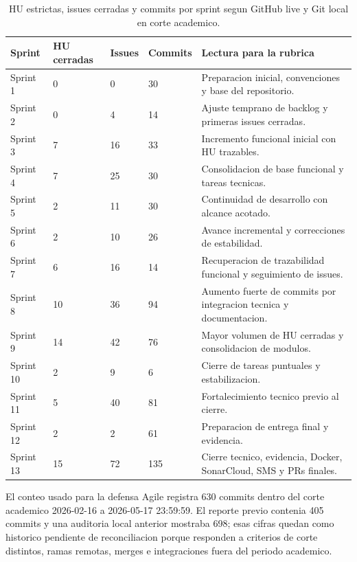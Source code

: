 \documentclass[11pt,a4paper]{article}
\begin{document}
\begin{table}[H]
\centering
\scriptsize
\begin{tabularx}{\linewidth}{P{1.8cm}P{1.6cm}P{1.7cm}P{1.9cm}Y}
\toprule
\textbf{Sprint} & \textbf{HU cerradas} & \textbf{Issues} & \textbf{Commits} & \textbf{Lectura para la rubrica} \\
\midrule
Sprint 1 & 0 & 0 & 30 & Preparacion inicial, convenciones y base del repositorio. \\
Sprint 2 & 0 & 4 & 14 & Ajuste temprano de backlog y primeras issues cerradas. \\
Sprint 3 & 7 & 16 & 33 & Incremento funcional inicial con HU trazables. \\
Sprint 4 & 7 & 25 & 30 & Consolidacion de base funcional y tareas tecnicas. \\
Sprint 5 & 2 & 11 & 30 & Continuidad de desarrollo con alcance acotado. \\
Sprint 6 & 2 & 10 & 26 & Avance incremental y correcciones de estabilidad. \\
Sprint 7 & 6 & 16 & 14 & Recuperacion de trazabilidad funcional y seguimiento de issues. \\
Sprint 8 & 10 & 36 & 94 & Aumento fuerte de commits por integracion tecnica y documentacion. \\
Sprint 9 & 14 & 42 & 76 & Mayor volumen de HU cerradas y consolidacion de modulos. \\
Sprint 10 & 2 & 9 & 6 & Cierre de tareas puntuales y estabilizacion. \\
Sprint 11 & 5 & 40 & 81 & Fortalecimiento tecnico previo al cierre. \\
Sprint 12 & 2 & 2 & 61 & Preparacion de entrega final y evidencia. \\
Sprint 13 & 15 & 72 & 135 & Cierre tecnico, evidencia, Docker, SonarCloud, SMS y PRs finales. \\
\bottomrule
\end{tabularx}
\caption{HU estrictas, issues cerradas y commits por sprint segun GitHub live y Git local en corte academico.}
\end{table}

El conteo usado para la defensa Agile registra 630 commits dentro del corte academico 2026-02-16 a 2026-05-17 23:59:59. El reporte previo contenia 405 commits y una auditoria local anterior mostraba 698; esas cifras quedan como historico pendiente de reconciliacion porque responden a criterios de corte distintos, ramas remotas, merges e integraciones fuera del periodo academico.
\end{document}
